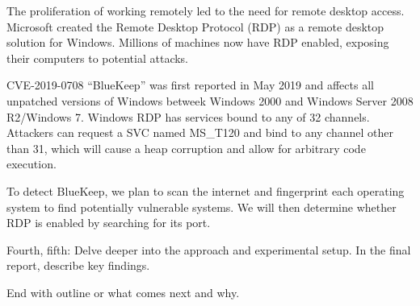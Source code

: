 The proliferation of working remotely led to the need for remote desktop
access. Microsoft created the Remote Desktop Protocol (RDP) as a remote
desktop solution for Windows. Millions of machines now have RDP 
enabled, exposing their computers to potential attacks.

CVE-2019-0708 ``BlueKeep'' was first reported in May 2019 and affects
all unpatched versions of Windows betweek Windows 2000 and Windows 
Server 2008 R2/Windows 7. Windows RDP has services bound to any of 
32 channels. Attackers can request a SVC named MS_T120 and bind to
any channel other than 31, which will cause a  heap corruption and allow
for arbitrary code execution.

To detect BlueKeep, we plan to scan the internet and fingerprint each 
operating system to find potentially vulnerable systems. We will then
determine whether RDP is enabled by searching for its port.

Fourth, fifth: Delve deeper into the approach and experimental setup. 
In the final report, describe key findings.

End with outline or what comes next and why. 
